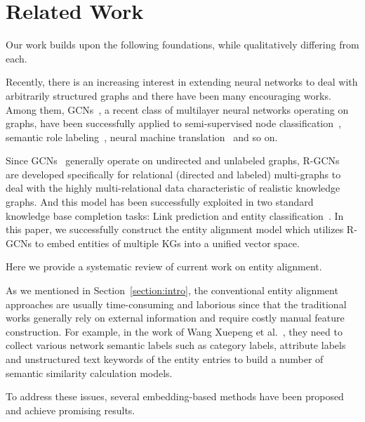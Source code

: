 
	
	\section{Related Work}
    Our work builds upon the following foundations, while qualitatively differing from each.

	Recently, there is an increasing interest in extending neural networks to deal with arbitrarily structured graphs and there have been
many encouraging works. Among them, GCNs~\cite{Duvenaud2015Convolutional,Kipf2016Semi,Kearnes2016Molecular}, a recent class of multilayer
neural networks operating on graphs, have been successfully applied to semi-supervised node classification~\cite{Kipf2016Semi}, semantic
role labeling~\cite{Marcheggiani2017Encoding}, neural machine translation~\cite{Bastings2017Graph} and so on.


	Since GCNs~\cite{Kipf2016Semi} generally operate on undirected and unlabeled graphs, R-GCNs~\cite{Schlichtkrull2017Modeling} are
developed specifically for relational (directed and labeled) multi-graphs to deal with the highly multi-relational data characteristic of
realistic knowledge graphs. And this model has been successfully exploited in two standard knowledge base completion tasks: Link prediction
and entity classification~\cite{Schlichtkrull2017Modeling}. In this paper, we successfully construct the entity alignment model which
utilizes R-GCNs to embed entities of multiple KGs into a unified vector space.
	
	Here we provide a systematic review of current work on entity alignment.
	
	As we mentioned in Section~\ref{section:intro}, the conventional entity alignment approaches are usually time-consuming and laborious since that the traditional works generally rely on external information and require costly manual feature construction. For example, in the work of Wang Xuepeng et al.~, they need to collect various network semantic labels such as category labels, attribute labels and unstructured text keywords of the entity entries to build a number of semantic similarity calculation models.
	
	To address these issues, several embedding-based methods have been proposed and achieve promising results.
	
